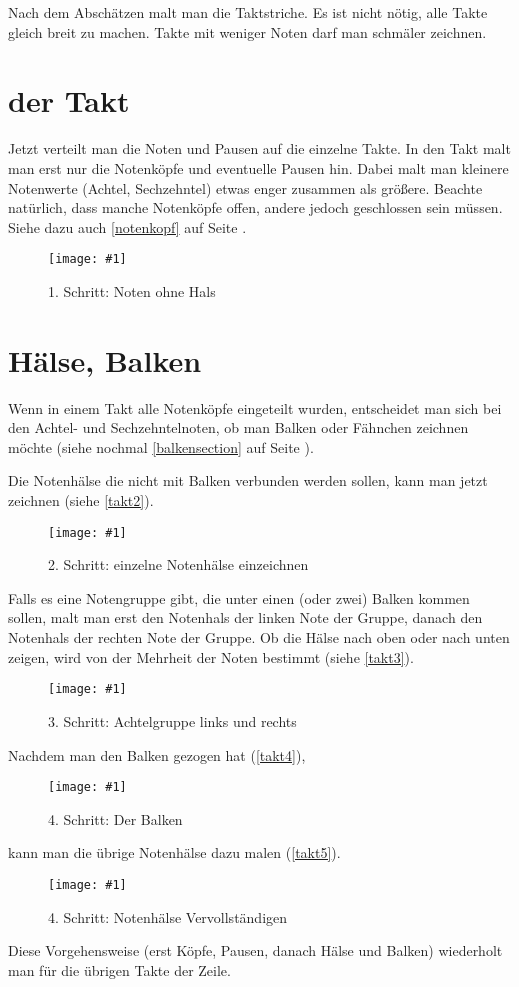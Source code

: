 \documentclass[10pt,a4paper,twoside]{report}
\newcommand{\comment}[1]{\marginpar{\begin{flushleft}
            \textsf{#1}
        \end{flushleft}}}
\newcommand{\image}[4]{
	\begin{figure}[!ht]
		\centering
		\texttt{[image: \#1]}
		\caption{#2}
		\label{#3}
	\end{figure}
}
\begin{document}
Nach dem Abschätzen malt man die Taktstriche. 
Es ist nicht nötig, 
alle Takte gleich breit 
zu machen. Takte mit weniger Noten darf man schmäler zeichnen. 

\section{der Takt}
Jetzt verteilt man die Noten und Pausen auf die einzelne Takte. 
In den Takt malt man erst 
nur die Notenköpfe und eventuelle Pausen hin. Dabei malt man
kleinere Notenwerte (Achtel, 
Sechzehntel) etwas enger 
zusammen als größere. Beachte natürlich, dass 
manche Notenköpfe offen, andere jedoch 
geschlossen sein müssen. Siehe dazu auch 
\autoref{notenkopf} auf Seite \pageref{notenkopf}.

\image{img/takt1-1.png}{1. Schritt: Noten ohne Hals}{takt1}{8}



\section{Hälse, Balken}
Wenn in einem Takt alle Notenköpfe eingeteilt wurden, 
entscheidet man sich bei den Achtel- 
und Sechzehntelnoten, ob man Balken oder Fähnchen 
zeichnen möchte (siehe nochmal 
\autoref{balkensection} auf Seite \pageref{balkensection}).

Die Notenhälse die nicht mit Balken verbunden werden sollen, 
kann man jetzt zeichnen (siehe \autoref{takt2}).

\image{img/takt2-1.png}{2. Schritt: einzelne Notenhälse einzeichnen}
{takt2}{8}

Falls es eine Notengruppe gibt, die unter einen (oder zwei)
Balken kommen sollen, malt man erst den Notenhals der linken Note
der Gruppe, danach den Notenhals der rechten Note der Gruppe. 
Ob die Hälse nach oben oder nach unten zeigen, 
wird von der Mehrheit der Noten bestimmt (siehe \autoref{takt3}).
 
\image{img/takt3-1.png}{3. Schritt: Achtelgruppe links und rechts}{takt3}{8}

Nachdem man den Balken gezogen hat (\autoref{takt4}), 
\image{img/takt4-1.png}{4. Schritt: Der Balken}{takt4}{8}

kann man die übrige Notenhälse dazu malen (\autoref{takt5}).
\image{img/takt5-1.png}{4. Schritt: Notenhälse Vervollständigen}{takt5}{8}

Diese Vorgehensweise (erst Köpfe, Pausen, danach Hälse und Balken)
\comment{Köpfe, Hälse, Balken (Hälse)} 
wiederholt man für die übrigen Takte der Zeile.
\end{document}
